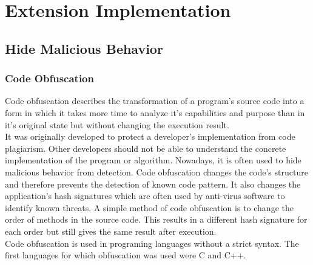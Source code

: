 
\section{Extension Implementation} %

	\subsection{Hide Malicious Behavior} %
	
		
	
		
		
		
		
		\subsubsection{Code Obfuscation}
			
			Code obfuscation describes the transformation of a program's source code into a form in which it takes more time to analyze it's capabilities and purpose than in it's original state but without changing the execution result. \\
			
			It was originally developed to protect a developer's implementation from code plagiarism. Other developers should not be able to understand the concrete implementation of the program or algorithm. Nowadays, it is often used to hide malicious behavior from detection. Code obfuscation changes the code's structure and therefore prevents the detection of known code pattern. It also changes the application's hash signatures which are often used by anti-virus software to identify known threats. A simple method of code obfuscation is to change the order of methods in the source code. This results in a different hash signature for each order but still gives the same result after execution. \\
			
			Code obfuscation is used in programing languages without a strict syntax. The first languages for which obfuscation was used were C and C++. 
			
		
